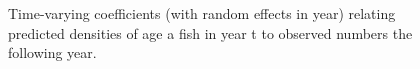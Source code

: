 \documentclass[
]{article}
\begin{document}
\begin{figure}


\caption{\label{fig-glm-coefficients-time}Time-varying coefficients
(with random effects in year) relating predicted densities of age a fish
in year t to observed numbers the following year.}

\end{figure}%
\end{document}
